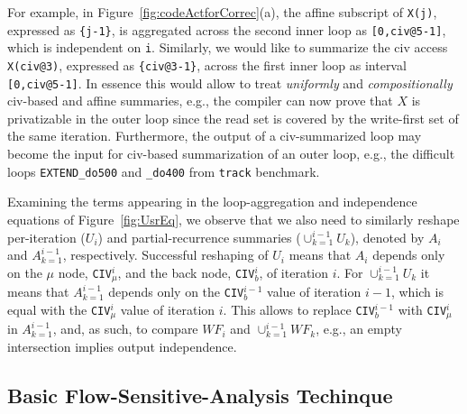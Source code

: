 \documentclass{sig-alternate}
\begin{document}
For example, in Figure~\ref{fig:codeActforCorrec}(a), the affine
subscript of {\tt X(j)}, expressed as {\tt\{j-1\}}, is aggregated across 
the second inner loop as {\tt[0,civ@5-1]}, which is independent on {\tt i}. 
Similarly, we would like to summarize the {\sc civ} access
{\tt X(civ@3)}, expressed as {\tt\{civ@3-1\}}, across 
the first inner loop as interval {\tt[0,civ@5-1]}. 
%
In essence this would allow to treat {\em uniformly} and {\em compositionally} 
{\sc civ}-based and affine summaries, e.g., the compiler can now prove that $X$ 
is privatizable in the outer loop since the read set is covered by the write-first 
set of the same iteration. 
Furthermore, the output of a {\sc civ}-summarized loop may 
become the input for {\sc civ}-based summarization of an outer loop,
e.g., the difficult loops {\tt EXTEND\_do500} and {\tt \_do400}
from {\tt track} benchmark.


%
Examining the terms appearing in the loop-aggregation and independence 
equations of Figure~\ref{fig:UsrEq}, we observe that we also need to similarly
reshape per-iteration ($U_i$) and partial-recurrence summaries 
($\cup_{k=1}^{i-1} U_k$), 
denoted by $A_i$ and $A_{k=1}^{i-1}$, respectively. 
%
Successful reshaping of $U_i$ means that $A_i$
depends only on the $\mu$ node, {\tt CIV}$_{\mu}^{i}$, 
and the back node, {\tt CIV}$_{b}^{i}$, of iteration $i$.
For $\cup_{k=1}^{i-1} U_k$ it means that $A_{k=1}^{i-1}$ depends
only on the {\tt CIV}$_{b}^{i-1}$ value of iteration $i-1$, which is
equal with the  {\tt CIV}$_{\mu}^{i}$ value of iteration $i$.
This allows to replace {\tt CIV}$_b^{i-1}$ with {\tt CIV}$_{\mu}^i$ in
$A_{k=1}^{i-1}$, and, as such, to compare $WF_i$ and $\cup_{k=1}^{i-1} WF_k$, 
e.g., an empty intersection implies output independence. 
%

\subsection{Basic Flow-Sensitive-Analysis Techinque}
\label{subsec:BasicTechn}
\end{document}
